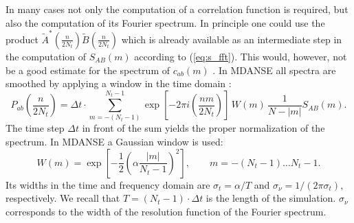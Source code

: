 \documentclass[a4paper,11pt]{article}
\begin{document}
\begin{appendices}
In many cases not only the computation of a correlation function is
required, but also the computation of its Fourier spectrum. In
principle one could use the product $\tilde
A^*\left(\frac{n}{2N_t}\right) \tilde B\left(\frac{n}{2N_t}\right)$
which is already available as an intermediate step in the computation
of $S_{AB}(m)$ according to (\ref{eq:s_fft}). This would, however, not
be a good estimate for the spectrum of $c_{ab}(m)$ \cite{Papoulis:1984}. In
\gls{MDANSE} all spectra are smoothed by applying a window in the time
domain \cite{Papoulis:1984}:
\begin{equation}
P_{ab}\left(\frac{n}{2N_t}\right) =
\Delta t\cdot \sum\limits_{m=-(N_t-1)}^{N_t-1}
\exp\left[-2\pi i\left(\frac{n m}{2N_t}\right)\right]
\,W(m)\,\frac{1}{N-|m|}S_{AB}(m).
\end{equation}
The time step $\Delta t$ in front of the sum yields the proper
normalization of the spectrum. In \gls{MDANSE} a Gaussian window
\cite{Harris} is used:
\begin{equation}
\label{eq:gauss_window}
W(m) = \exp\left[
-\frac{1}{2}\left(\alpha\frac{|m|}{N_t-1}\right)^2
\right],
\qquad m = -(N_t-1)\ldots N_t-1.
\end{equation}
Its widths in the time and frequency domain are $\sigma_t = \alpha/T$
and $\sigma_\nu = 1/(2\pi\sigma_t)$, respectively. We recall that $T =
(N_t-1)\cdot\Delta t$ is the length of the simulation. $\sigma_\nu$
corresponds to the width of the resolution function of the Fourier spectrum.
\end{appendices}

\newpage

\printglossary[type=acronym]
\end{document}

